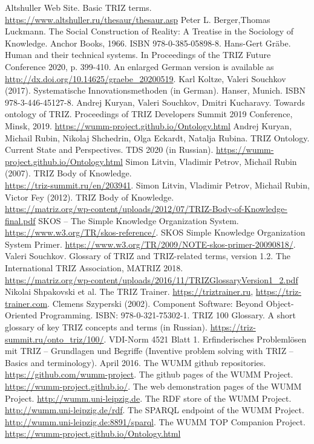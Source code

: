 \documentclass[11pt,a4paper]{article}
\begin{document}
\begin{thebibliography}{xxx}
  \raggedright
{} Altshuller Web Site. Basic TRIZ terms.
  \url{https://www.altshuller.ru/thesaur/thesaur.asp}
 Peter L. Berger,Thomas Luckmann. The Social
  Construction of Reality: A Treatise in the Sociology of Knowledge. Anchor
  Books, 1966. ISBN 978-0-385-05898-8.
 Hans-Gert Gr\"abe. Human and their technical systems.  In
  Proceedings of the TRIZ Future Conference 2020, p. 399-410.  An enlarged
  German version is available as
  \url{http://dx.doi.org/10.14625/graebe_20200519}. 
 Karl Koltze, Valeri Souchkov (2017).  Systematische
  Innovationsmethoden (in German).  Hanser, Munich. ISBN 978-3-446-45127-8.
 Andrej Kuryan, Valeri Souchkov, Dmitri Kucharavy. Towards
  ontology of TRIZ. Proceedings of TRIZ Developers Summit 2019 Conference,
  Minsk, 2019.  \url{https://wumm-project.github.io/Ontology.html}
 Andrej Kuryan, Michail Rubin, Nikolaj Shchedrin, Olga
  Eckardt, Natalja Rubina.  TRIZ Ontology. Current State and Perspectives. TDS
  2020 (in Russian).  \url{https://wumm-project.github.io/Ontology.html}
 Simon Litvin, Vladimir Petrov, Michail Rubin (2007). TRIZ
  Body of Knowledge. \\ \url{https://triz-summit.ru/en/203941}.
 Simon Litvin, Vladimir Petrov, Michail Rubin, Victor Fey
  (2012). TRIZ Body of
  Knowledge. \\ \url{https://matriz.org/wp-content/uploads/2012/07/TRIZ-Body-of-Knowledge-final.pdf}
 SKOS -- The Simple Knowledge Organization System.
  \url{https://www.w3.org/TR/skos-reference/}.  
 SKOS Simple Knowledge Organization System Primer.
  \url{https://www.w3.org/TR/2009/NOTE-skos-primer-20090818/}.  
 Valeri Souchkov. Glossary of TRIZ and TRIZ-related
  terms, version 1.2.  The International TRIZ Association, MATRIZ
  2018.\\ \url{https://matriz.org/wp-content/uploads/2016/11/TRIZGlossaryVersion1_2.pdf}
 Nikolai Shpakovski et al. The TRIZ Trainer.
  \url{https://triztrainer.ru}, \url{https://triz-trainer.com}.
 Clemens Szyperski (2002). Component Software: Beyond
  Object-Oriented Programming. ISBN: 978-0-321-75302-1.
 TRIZ 100 Glossary. A short glossary of key TRIZ
  concepts and terms (in Russian).
  \url{https://triz-summit.ru/onto_triz/100/}.
 VDI-Norm 4521 Blatt 1. Erfinderisches Problemlösen mit TRIZ --
  Grundlagen und Begriffe (Inventive problem solving with TRIZ -- Basics and
  terminology). April 2016.
 The WUMM github repositories.
  \url{https://github.com/wumm-project}. 
 The github pages of the WUMM Project.
  \url{https://wumm-project.github.io/}. 
 The web demonstration pages of the WUMM Project.
  \url{http://wumm.uni-leipzig.de}.
 The RDF store of the WUMM Project.
  \url{http://wumm.uni-leipzig.de/rdf}.
 The SPARQL endpoint of the WUMM Project.
  \url{http://wumm.uni-leipzig.de:8891/sparql}.
 The WUMM TOP Companion Project.
  \url{https://wumm-project.github.io/Ontology.html}
\end{thebibliography}
\end{document}
